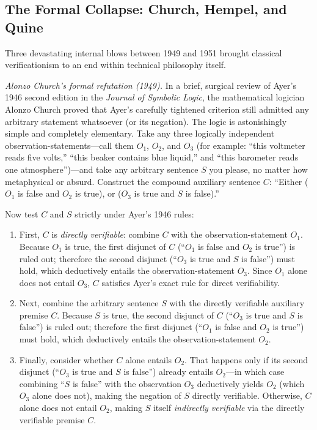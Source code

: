 \subsection{The Formal Collapse: Church, Hempel, and Quine}

Three devastating internal blows between 1949 and 1951 brought classical verificationism to an end within technical philosophy itself.

\emph{Alonzo Church's formal refutation (1949).} In a brief, surgical review of Ayer's 1946 second edition in the \emph{Journal of Symbolic Logic}, the mathematical logician Alonzo Church proved that Ayer's carefully tightened criterion still admitted any arbitrary statement whatsoever (or its negation). The logic is astonishingly simple and completely elementary. Take any three logically independent observation-statements---call them $O_1$, $O_2$, and $O_3$ (for example: ``this voltmeter reads five volts,'' ``this beaker contains blue liquid,'' and ``this barometer reads one atmosphere'')---and take any arbitrary sentence $S$ you please, no matter how metaphysical or absurd. Construct the compound auxiliary sentence $C$: ``Either ($O_1$ is false and $O_2$ is true), or ($O_3$ is true and $S$ is false).''

Now test $C$ and $S$ strictly under Ayer's 1946 rules:

\begin{enumerate}
\item First, $C$ is \emph{directly verifiable}: combine $C$ with the observation-statement $O_1$. Because $O_1$ is true, the first disjunct of $C$ (``$O_1$ is false and $O_2$ is true'') is ruled out; therefore the second disjunct (``$O_3$ is true and $S$ is false'') must hold, which deductively entails the observation-statement $O_3$. Since $O_1$ alone does not entail $O_3$, $C$ satisfies Ayer's exact rule for direct verifiability.
\item Next, combine the arbitrary sentence $S$ with the directly verifiable auxiliary premise $C$. Because $S$ is true, the second disjunct of $C$ (``$O_3$ is true and $S$ is false'') is ruled out; therefore the first disjunct (``$O_1$ is false and $O_2$ is true'') must hold, which deductively entails the observation-statement $O_2$.
\item Finally, consider whether $C$ alone entails $O_2$. That happens only if its second disjunct (``$O_3$ is true and $S$ is false'') already entails $O_2$---in which case combining ``$S$ is false'' with the observation $O_3$ deductively yields $O_2$ (which $O_3$ alone does not), making the negation of $S$ directly verifiable. Otherwise, $C$ alone does not entail $O_2$, making $S$ itself \emph{indirectly verifiable} via the directly verifiable premise $C$.
\end{enumerate}


